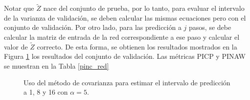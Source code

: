 \documentclass[12pt]{article}
\begin{document}
Notar que $\tilde{Z}$ nace del conjunto de prueba, por lo tanto, para evaluar el intervalo de la varianza de validación, se deben calcular las mismas ecuaciones pero con el conjunto de validación. Por otro lado, para las predicción a $j$ pasos, se debe calcular la matriz de entrada de la red correspondiente a ese paso y calcular el valor de $\tilde{Z}$ correcto. De esta forma, se obtienen los resultados mostrados en la Figura \ref{cov_val} los resultados del conjunto de validación. Las métricas PICP y PINAW se muestran en la Tabla \ref{pinc_red}

\begin{figure}[h!]
	\centering
	\captionsetup{justification=centering}
	 \newline
	\caption{Uso del método de covarianza para estimar el intervalo de predicción a 1, 8 y 16 con $\alpha=5$.}
	\label{cov_val}
\end{figure}
\end{document}
